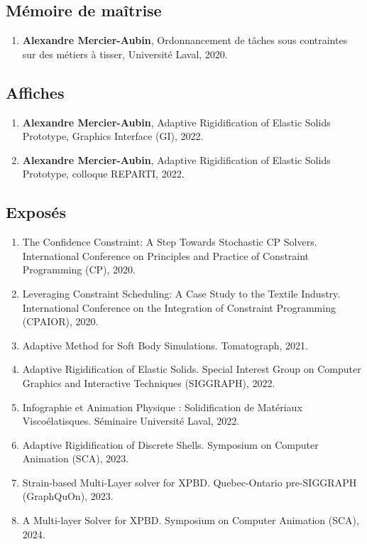 \documentclass[10pt]{article} %
\begin{document}
\subsection{Mémoire de maîtrise}
\begin{enumerate}
  \setcounter{enumi}{\value{listCounter}}
  \item \textbf{Alexandre Mercier-Aubin}, Ordonnancement de tâches sous contraintes sur des métiers à tisser, Université Laval, 2020. 
\end{enumerate}

\subsection{Affiches}
\begin{enumerate}
  \setcounter{enumi}{\value{listCounter}}
  \item \textbf{Alexandre Mercier-Aubin}, Adaptive Rigidification of Elastic Solids Prototype, Graphics Interface (GI), 2022. 
  \item \textbf{Alexandre Mercier-Aubin}, Adaptive Rigidification of Elastic Solids Prototype, colloque REPARTI, 2022. 
\end{enumerate}

\subsection{Exposés}
\begin{enumerate}
  \setcounter{enumi}{\value{listCounter}}
  \item The Confidence Constraint: A Step Towards Stochastic CP Solvers. International Conference on Principles and Practice of Constraint Programming (CP), 2020.
  \item  Leveraging Constraint Scheduling: A Case Study to the Textile Industry. International Conference on the Integration of Constraint Programming (CPAIOR), 2020.
  \item Adaptive Method for Soft Body Simulations. Tomatograph, 2021.
  \item Adaptive Rigidification of Elastic Solids. Special Interest Group on Computer Graphics and Interactive Techniques (SIGGRAPH), 2022. 
  \item Infographie et Animation Physique : Solidification de Matériaux Viscoélatisques.  Séminaire Université Laval, 2022.
  \item Adaptive Rigidification of Discrete Shells. Symposium on Computer Animation (SCA), 2023. 
  \item Strain-based Multi-Layer solver for XPBD. Quebec-Ontario pre-SIGGRAPH (GraphQuOn), 2023.
  \item A Multi-layer Solver for XPBD. Symposium on Computer Animation (SCA), 2024. 
\end{enumerate}
\end{document}
